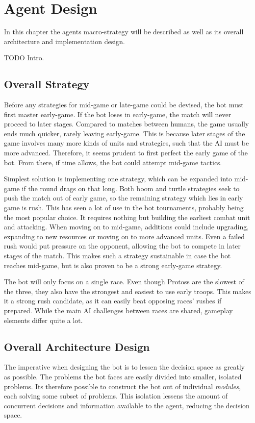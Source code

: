 \chapter{Agent Design}
In this chapter the agents macro-strategy will be described as well as its overall architecture and implementation design.

TODO Intro.

\section{Overall Strategy}
Before any strategies for mid-game or late-game could be devised, the bot must first master early-game. If the bot loses in early-game, the match will never proceed to later stages. Compared to matches between humans, the game usually ends much quicker, rarely leaving early-game. This is because later stages of the game involves many more kinds of units and strategies, such that the AI must be more advanced. Therefore, it seems prudent to first perfect the early game of the bot. From there, if time allows, the bot could attempt mid-game tactics.

Simplest solution is implementing one strategy, which can be expanded into mid-game if the round drags on that long. Both boom and turtle strategies seek to push the match out of early game, so the remaining strategy which lies in early game is rush. This has seen a lot of use in the bot tournaments, probably being the most popular choice. It requires nothing but building the earliest combat unit and attacking. When moving on to mid-game, additions could include upgrading, expanding to new resources or moving on to more advanced units. Even a failed rush would put pressure on the opponent, allowing the bot to compete in later stages of the match. This makes such a strategy sustainable in case the bot reaches mid-game, but is also proven to be a strong early-game strategy.

The bot will only focus on a single race. Even though Protoss are the slowest of the three, they also have the strongest and easiest to use early troops. This makes it a strong rush candidate, as it can easily beat opposing races' rushes if prepared. While the main AI challenges between races are shared, gameplay elements differ quite a lot.

\section{Overall Architecture Design}
The imperative when designing the bot is to lessen the decision space as greatly as possible. The problems the bot faces are easily divided into smaller, isolated problems. Its therefore possible to construct the bot out of individual \emph{modules}, each solving some subset of problems. This isolation lessens the amount of concurrent decisions and information available to the agent, reducing the decision space.

